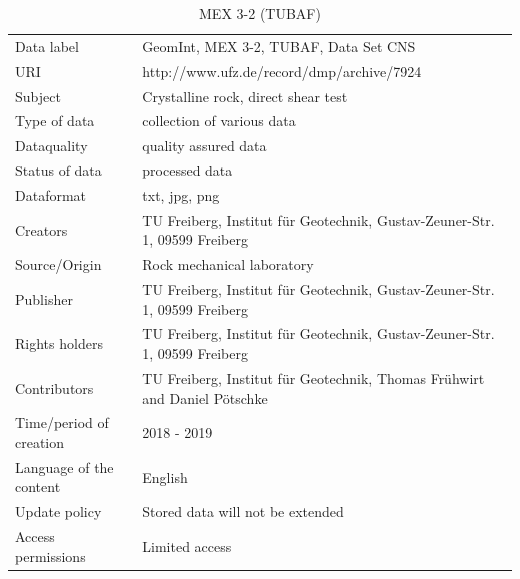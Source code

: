 \begin{table}[!ht]
\caption{MEX 3-2 (TUBAF)}
\label{tab:dms-mex3-2}
\small
\begin{tabular}{R{3cm}|L{7cm}}
\hline
%
Data label & GeomInt, MEX 3-2, TUBAF, Data Set CNS \\
URI & http://www.ufz.de/record/dmp/archive/7924 \\
Subject  & Crystalline rock, direct shear test \\
Type of data  & collection of various data \\
Dataquality  & quality assured data \\
Status of data  & processed data \\
Dataformat  & txt, jpg, png \\
Creators  & TU Freiberg, Institut für Geotechnik, Gustav-Zeuner-Str. 1, 09599 Freiberg \\
Source/Origin  & Rock mechanical laboratory \\
Publisher  & TU Freiberg, Institut für Geotechnik, Gustav-Zeuner-Str. 1, 09599 Freiberg \\
Rights holders  & TU Freiberg, Institut für Geotechnik, Gustav-Zeuner-Str. 1, 09599 Freiberg \\
Contributors  & TU Freiberg, Institut für Geotechnik, Thomas Fr\"uhwirt and Daniel P\"otschke \\
Time/period of creation  & 2018 - 2019 \\
Language of the content & English \\
Update policy  & Stored data will not be extended \\
Access permissions  & Limited access \\
%
\hline
\end{tabular}
\end{table}